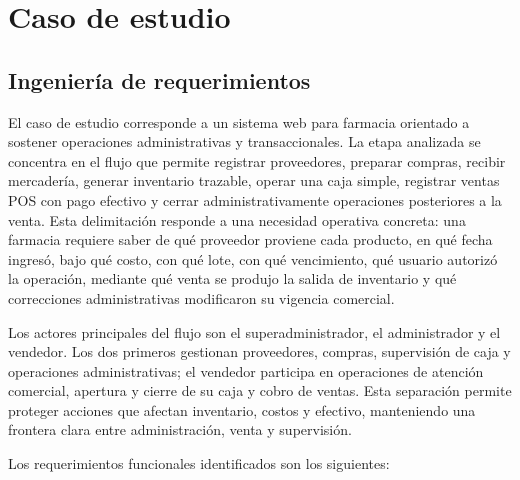 \chapter{Caso de estudio}

\section{Ingeniería de requerimientos}

El caso de estudio corresponde a un sistema web para farmacia orientado a sostener operaciones administrativas y transaccionales. La etapa analizada se concentra en el flujo que permite registrar proveedores, preparar compras, recibir mercadería, generar inventario trazable, operar una caja simple, registrar ventas POS con pago efectivo y cerrar administrativamente operaciones posteriores a la venta. Esta delimitación responde a una necesidad operativa concreta: una farmacia requiere saber de qué proveedor proviene cada producto, en qué fecha ingresó, bajo qué costo, con qué lote, con qué vencimiento, qué usuario autorizó la operación, mediante qué venta se produjo la salida de inventario y qué correcciones administrativas modificaron su vigencia comercial.

Los actores principales del flujo son el superadministrador, el administrador y el vendedor. Los dos primeros gestionan proveedores, compras, supervisión de caja y operaciones administrativas; el vendedor participa en operaciones de atención comercial, apertura y cierre de su caja y cobro de ventas. Esta separación permite proteger acciones que afectan inventario, costos y efectivo, manteniendo una frontera clara entre administración, venta y supervisión.

Los requerimientos funcionales identificados son los siguientes:

